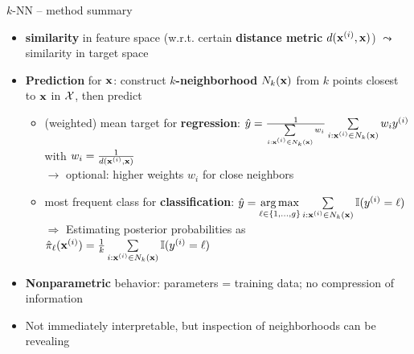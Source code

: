 \begin{frame}{$k$-NN -- method summary}

 
 

\medskip

\begin{itemize}
  \item \textbf{similarity} in feature space (w.r.t. certain \textbf{distance metric} $d(\mathbf{x}^{(i)},\mathbf{x})$) $\leadsto$ similarity in target space 
  \item \textbf{Prediction} for $\mathbf{x}$: construct \textbf{$k$-neighborhood} 
  $N_k(\mathbf{x})$ from $k$ points closest to $\mathbf{x}$ in $\mathcal{X}$, then 
  predict
  \begin{itemize}
    \footnotesize
    \item (weighted) mean target for \textbf{regression}: 
    $\hat{y} = \tfrac{1}{\sum\limits_{i: \mathbf{x}^{(i)} \in N_k(\mathbf{x})} w_i}  
    \sum\limits_{i: \mathbf{x}^{(i)} \in N_k(\mathbf{x})} w_i y^{(i)} $ with $w_i = \tfrac{1}{d(\mathbf{x}^{(i)},\mathbf{x})}$\\
    $\rightarrow$ optional: higher weights $w_i$ for close neighbors
    \item most frequent class for \textbf{classification}: 
    $\hat{y} = \underset{\ell \in \{1, \ldots, g\}}{\mathrm{\operatorname{arg\,max}}} \sum\limits_{i: \mathbf{x}^{(i)} \in N_k(\mathbf{x})} \mathbb{I}(y^{(i)} = \ell)$\\
    $\Rightarrow$ Estimating posterior probabilities as $\hat{\pi}_{\ell}(\mathbf{x}^{(i)})= \frac{1}{k} \sum\limits_{i: \mathbf{x}^{(i)} \in N_k(\mathbf{x})} \mathbb{I}(y^{(i)} = \ell)$
  \end{itemize}
  \item \textbf{Nonparametric} behavior: parameters = training data; no 
  compression of information
  \item Not immediately interpretable, but inspection of neighborhoods can be revealing
\end{itemize}
\end{frame}


